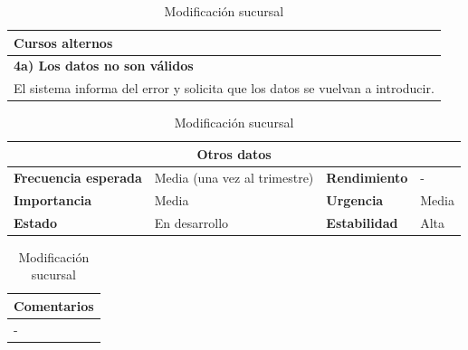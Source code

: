 \documentclass[12pt,spanish]{article}
\begin{document}
\begin{table}[H]
\vspace{1cm}

\begin{tabular}{|m{10pt}|m{7.15cm}|m{10pt}|m{7.15cm}|}
\hline
\multicolumn{4}{|m{16.2cm}|}{\textbf{Cursos alternos}} \\
\hline
\multicolumn{4}{|m{16.2cm}|}{\textbf{4a) Los datos no son válidos}} \\
\hline
\multicolumn{4}{|m{16.2cm}|}{El sistema informa del error y solicita que los datos se vuelvan a introducir.} \\
\hline
\end{tabular}

\vspace{1cm}

\begin{tabular}{|m{3.72cm}|m{3.72cm}|m{3.72cm}|m{3.72cm}|}
\hline
\multicolumn{4}{|c|}{\textbf{Otros datos}} \\
\hline
\textbf{Frecuencia esperada} & Media (una vez al trimestre) & \textbf{Rendimiento} & - \\
\hline
\textbf{Importancia} & Media & \textbf{Urgencia} & Media \\
\hline
\textbf{Estado} & En desarrollo & \textbf{Estabilidad} & Alta \\
\hline
\end{tabular}

\vspace{1cm}

\begin{tabular}{|m{16.2cm}|}
\hline
\textbf{Comentarios} \\
\hline
- \\
\hline
\end{tabular}

\caption{Modificación sucursal}

\end{table}

\end{document}
